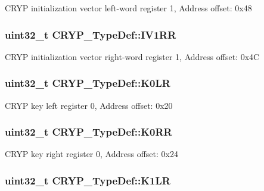C\-R\-Y\-P initialization vector left-\/word register 1, Address offset\-: 0x48 \hypertarget{struct_c_r_y_p___type_def_aca99392151eb711971f5260ca675c81b}{
\subsubsection[{I\-V1\-R\-R}]{ uint32\-\_\-t C\-R\-Y\-P\-\_\-\-Type\-Def\-::\-I\-V1\-R\-R}}\label{struct_c_r_y_p___type_def_aca99392151eb711971f5260ca675c81b}
C\-R\-Y\-P initialization vector right-\/word register 1, Address offset\-: 0x4\-C \hypertarget{struct_c_r_y_p___type_def_a9dc2c37bda5dd59196c295be21c1f88b}{
\subsubsection[{K0\-L\-R}]{ uint32\-\_\-t C\-R\-Y\-P\-\_\-\-Type\-Def\-::\-K0\-L\-R}}\label{struct_c_r_y_p___type_def_a9dc2c37bda5dd59196c295be21c1f88b}
C\-R\-Y\-P key left register 0, Address offset\-: 0x20 \hypertarget{struct_c_r_y_p___type_def_a2a1fdc979620667cc9c40c5caa5cd6ba}{
\subsubsection[{K0\-R\-R}]{ uint32\-\_\-t C\-R\-Y\-P\-\_\-\-Type\-Def\-::\-K0\-R\-R}}\label{struct_c_r_y_p___type_def_a2a1fdc979620667cc9c40c5caa5cd6ba}
C\-R\-Y\-P key right register 0, Address offset\-: 0x24 \hypertarget{struct_c_r_y_p___type_def_a816fc42432d8064efbf944430e45050d}{
\subsubsection[{K1\-L\-R}]{ uint32\-\_\-t C\-R\-Y\-P\-\_\-\-Type\-Def\-::\-K1\-L\-R}}\label{struct_c_r_y_p___type_def_a816fc42432d8064efbf944430e45050d}
